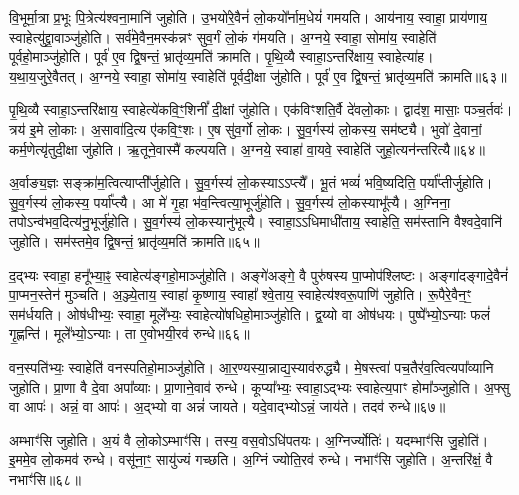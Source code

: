 वि॒भूर्मा॒त्रा प्र॒भूः पि॒त्रेत्य॑श्वना॒मानि॑ जुहोति।
उ॒भयो॑रे॒वैनं॑ लो॒कयो᳚र्नाम॒धेयं॑ गमयति।
आय॑नाय॒ स्वाहा॒ प्राय॑णाय॒ स्वाहेत्यु॑द्द्रा॒वाञ्जु॑होति।
सर्व॑मे॒वैन॒मस्क॑न्नꣳ सुव॒र्गं लो॒कं ग॑मयति।
अ॒ग्नये॒ स्वाहा॒ सोमा॑य॒ स्वाहेति॑ पूर्वहो॒माञ्जु॑होति।
पूर्व॑ ए॒व द्वि॒षन्तं॒ भ्रातृ॑व्य॒मति॑ क्रामति।
पृ॒थि॒व्यै स्वाहा॒\-ऽन्तरि॑क्षाय॒ स्वाहेत्या॑ह।
य॒था॒\-य॒जु\-रे॒वै\-तत्।
अ॒ग्नये॒ स्वाहा॒ सोमा॑य॒ स्वाहेति॑ पूर्वदी॒क्षा जु॑होति।
पूर्व॑ ए॒व द्वि॒षन्तं॒ भ्रातृ॑व्य॒मति॑ क्रामति॥६३॥\ip

पृ॒थि॒व्यै स्वाहा॒\-ऽन्तरि॑क्षाय॒ स्वाहेत्ये॑कवि॒ꣳ॒शिनीं᳚ दी॒क्षां जु॑होति।
एक॑विꣳशति॒र्वै दे॑वलो॒काः।
द्वाद॑श॒ मासाः॒ पञ्च॒र्तवः॑।
त्रय॑ इ॒मे लो॒काः।
अ॒सावा॑दि॒त्य ए॑कवि॒ꣳ॒शः।
ए॒ष सु॑व॒र्गो लो॒कः।
सु॒व॒र्गस्य॑ लो॒कस्य॒ सम॑ष्ट्यै।
भुवो॑ दे॒वानां॒ कर्म॒णेत्यृ॑तुदी॒क्षा जु॑होति।
ऋ॒तूने॒वास्मै॑ कल्पयति।
अ॒ग्नये॒ स्वाहा॑ वा॒यवे॒ स्वाहेति॑ जुहो॒त्यन॑न्तरित्यै॥६४॥\ip

अ॒र्वाङ्य॒ज्ञः सङ्क्रा॑म॒त्वित्याप्ती᳚र्जुहोति।
सु॒व॒र्गस्य॑ लो॒कस्याऽऽप्त्यै᳚।
भू॒तं भव्यं॑ भवि॒ष्यदिति॒ पर्या᳚प्तीर्जुहोति।
सु॒व॒र्गस्य॑ लो॒कस्य॒ पर्या᳚प्त्यै।
आ मे॑ गृ॒हा भ॑व॒न्त्वित्या॒भूर्जु॑होति।
सु॒व॒र्गस्य॑ लो॒कस्याभू᳚त्यै।
अ॒ग्निना॒ तपो\-ऽन्व॑भव॒दित्य॑नु॒भूर्जु॑होति।
सु॒व॒र्गस्य॑ लो॒कस्यानु॑भूत्यै।
स्वाहा॒\-ऽऽधिमाधी॑ताय॒ स्वाहेति॒ सम॑स्तानि वैश्वदे॒वानि॑ जुहोति।
सम॑स्तमे॒व द्वि॒षन्तं॒ भ्रातृ॑व्य॒मति॑ क्रामति॥६५॥\ip

द॒द्भ्यः स्वाहा॒ हनू᳚भ्या॒ꣴ॒ स्वाहेत्य॑ङ्गहो॒माञ्जु॑होति।
अङ्गे॑अङ्गे॒ वै पुरु॑षस्य पा॒प्मोप॑श्लिष्टः।
अङ्गा॑दङ्गादे॒वैनं॑ पा॒प्मन॒स्तेन॑ मुञ्चति।
अ॒ञ्ज्ये॒ताय॒ स्वाहा॑ कृ॒ष्णाय॒ स्वाहा᳚ श्वे॒ताय॒ स्वाहेत्य॑श्वरू॒पाणि॑ जुहोति।
रू॒पैरे॒वैन॒ꣳ॒ सम॑र्धयति।
ओष॑धीभ्यः॒ स्वाहा॒ मूले᳚भ्यः॒ स्वाहेत्यो॑षधिहो॒माञ्जु॑होति।
द्व॒य्यो वा ओष॑धयः।
पुष्पे᳚भ्यो॒\-ऽन्याः फलं॑ गृ॒ह्णन्ति॑।
मूले᳚भ्यो॒\-ऽन्याः।
ता ए॒वोभयी॒रव॑ रुन्धे॥६६॥\ip

वन॒स्पति॑भ्यः॒ स्वाहेति॑ वनस्पतिहो॒माञ्जु॑होति।
आ॒र॒ण्यस्या॒\-न्नाद्य॒स्या\-व॑\-रुद्ध्यै।
मे॒षस्त्वा॑ पच॒तैर॑व॒त्वित्यपा᳚व्यानि जुहोति।
प्रा॒णा वै दे॒वा अपा᳚व्याः।
प्रा॒णाने॒वाव॑ रुन्धे।
कूप्या᳚भ्यः॒ स्वाहा॒ऽद्भ्यः स्वाहेत्य॒पाꣳ होमा᳚ञ्जुहोति।
अ॒फ्सु वा आपः॑।
अन्नं॒ वा आपः॑।
अ॒द्भ्यो वा अन्नं॑ जायते।
यदे॒वाद्भ्यो\-ऽन्नं॒ जाय॑ते।
तदव॑ रुन्धे॥६७॥\ip\anuvakamend[पू॒र्व॒दी॒क्षा जु॑होति॒ पूर्व॑ ए॒व द्वि॒षन्तं॒ भ्रातृ॑व्य॒मति॑ क्राम॒त्यन॑न्तरित्यै क्रामति रुन्धे॒ जाय॑त॒ एकं॑ च]

अम्भाꣳ॑सि जुहोति।
अ॒यं वै लो॒को\-ऽम्भाꣳ॑सि।
तस्य॒ वस॒वो\-ऽधि॑पतयः।
अ॒ग्निर्ज्योतिः॑।
यदम्भाꣳ॑सि जु॒होति॑।
इ॒ममे॒व लो॒कमव॑ रुन्धे।
वसू॑ना॒ꣳ॒ सायु॑ज्यं गच्छति।
अ॒ग्निं ज्योति॒रव॑ रुन्धे।
नभाꣳ॑सि जुहोति।
अ॒न्तरि॑क्षं॒ वै नभाꣳ॑सि॥६८॥\ip


